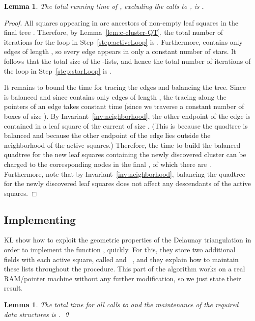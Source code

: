\documentclass[11pt]{paper}
\newtheorem {lem}[theorem] {Lemma}
\begin{document}
\begin{lem}\label{lem:node-explore}
The total running time of \emph{}, excluding the
calls to \emph{}, is 
\emph{}.
\end{lem}

\begin{proof}
All squares appearing in  are ancestors of non-empty
leaf squares in the final tree . Therefore, by
Lemma~\ref{lem:c-cluster-QT},
the total number of iterations for the loop in
Step~\ref{step:activeLoop} is . Furthermore, 
 contains only edges of length , so every
edge appears in only a constant number of stars. It follows that the
total size of the -lists, and hence the total number of
iterations of the loop in Step~\ref{step:starLoop} is
.

It remains to bound the time for tracing the edges and balancing the
tree.  Since  is balanced and since  contains
only edges of length , the tracing along the 
pointers of an edge takes constant time (since we traverse a constant number
of boxes of size ). By Invariant~\ref{inv:neighborhood},
the other endpoint of the edge  is contained in a leaf square
of the current  of size . (This is because the quadtree
is balanced and because the other endpoint of the edge lies outside
the neighborhood of the active squares.) Therefore, the time to build
the balanced
quadtree for the new leaf squares containing the newly discovered cluster
can be charged to the corresponding nodes in the final , of which
there are . Furthermore, note that by
Invariant~\ref{inv:neighborhood}, balancing the quadtree for the newly
discovered leaf squares does not affect any descendants of the active
squares.
\end{proof}

\subsection {Implementing }

KL show how to exploit the geometric properties of the Delaunay triangulation
in order to implement the function ,
quickly. For this, they store two additional fields with each
active square, called  and
~\cite[Section~6]{KrznaricLe98}, and they explain how to
maintain these lists throughout the procedure. This part of the algorithm works 
on a real RAM/pointer machine without any further modification, so we 
just state their result.
\begin{lem}\label{lem:findStar}
The total time for all calls to \emph{} and the
maintenance of the required data structures is
\emph{}.
\qed
\end{lem}
\end{document}
